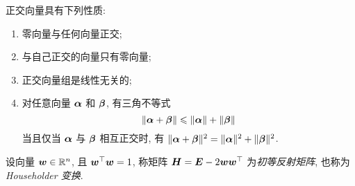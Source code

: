 正交向量具有下列性质:
\begin{enumerate}[label=(\arabic{*})]
    \item 零向量与任何向量正交;
    \item 与自己正交的向量只有零向量;
    \item 正交向量组是线性无关的;
    \item 对任意向量 $ \vb*{\alpha} $ 和 $ \vb*{\beta} $, 有三角不等式
          $$\|\vb*{\alpha}+\vb*{\beta}\| \leqslant\|\vb*{\alpha}\|+\|\vb*{\beta}\|$$
          当且仅当 $ \vb*{\alpha} $ 与 $ \vb*{\beta} $ 相互正交时, 有 $ \|\vb*{\alpha}+\vb*{\beta}\|^{2}=\|\vb*{\alpha}\|^{2}+\|\vb*{\beta}\|^{2} $.
\end{enumerate}

\begin{definition}[初等反射矩阵]
    设向量 $\vb*{w}\in \mathbb{R}^{n}$, 且 $\vb*{w}^\top\vb*{w}=1$, 称矩阵 $\vb*{H}=\vb*{E}-2\vb*{ww}^\top$ 为\textit{初等反射矩阵}, 也称为 \textit{Householder 变换}.
\end{definition}

